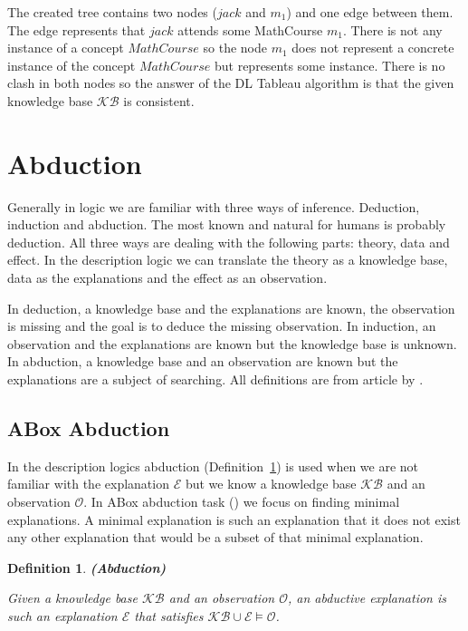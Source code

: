 \documentclass[12pt,a4paper]{article}
\newtheorem{definition}{Definition}[subsection]
\begin{document}
The created tree contains two nodes ($jack$ and $m_{1}$) and one edge between them. The edge represents that $jack$ attends some MathCourse $m_{1}$. There is not any instance of a concept $MathCourse$ so the node $m_{1}$ does not represent a concrete instance of the concept $MathCourse$ but represents some instance. There is no clash in both nodes so the answer of the DL Tableau algorithm is that the given knowledge base $\mathcal{KB}$ is consistent.

\pagebreak
\section{Abduction}
Generally in logic we are familiar with three ways of inference. Deduction, induction and abduction. The most known and natural for humans is probably deduction. All three ways are dealing with the following parts: theory, data and effect. In the description logic we can translate the theory as a knowledge base, data as the explanations and the effect as an observation.

In deduction, a knowledge base and the explanations are known, the observation is missing and the goal is to deduce the missing observation. In induction, an observation and the explanations are known but the knowledge base is unknown. In abduction, a knowledge base and an observation are known but the explanations are a subject of searching. All definitions are from article by \cite{pukancovaAboxAbduction}.

\subsection{ABox Abduction}
In the description logics abduction (Definition~\ref{def:abduction}) is used when we are not familiar with the explanation $\mathcal{E}$ but we know a knowledge base $\mathcal{KB}$ and an observation $\mathcal{O}$. In ABox abduction task (\cite{Elsenbroich2006}) we focus on finding minimal explanations. A minimal explanation is such an explanation that it does not exist any other explanation that would be a subset of that minimal explanation.

\begin{definition}{\textbf{(Abduction)}} 
	\label{def:abduction}
		
	Given a knowledge base $\mathcal{KB}$ and an observation $\mathcal{O}$, an abductive explanation is such an explanation $\mathcal{E}$ that satisfies $\mathcal{KB} \cup \mathcal{E} \models \mathcal{O}$.
\end{definition}
\end{document}
